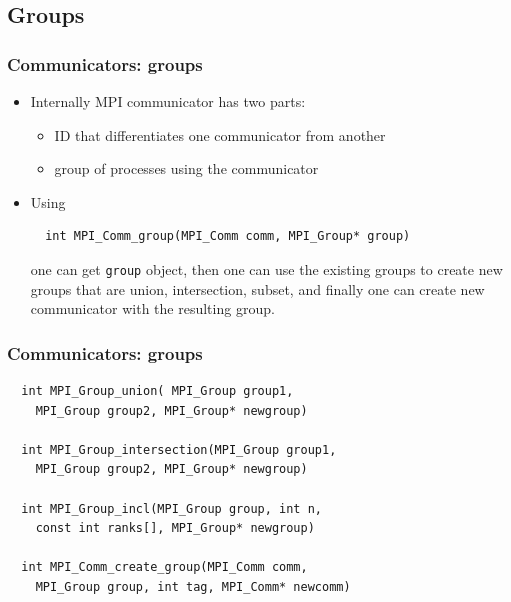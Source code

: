 \documentclass{beamer}
\begin{document}
\subsection{Groups}
\begin{frame}[fragile]
  \frametitle{Communicators: groups}
\begin{itemize}
\item Internally MPI communicator has two parts:
\begin{itemize}
\item ID that differentiates one communicator from another
\item group of processes using the communicator
\end{itemize}
\item Using
{\color{mycolorcode}
\begin{verbatim}
  int MPI_Comm_group(MPI_Comm comm, MPI_Group* group)
\end{verbatim}
}
one can get {\color{mycolorcode}\verb|group|} object, then one can use the existing groups to create new groups that are union, intersection, subset, and finally one can create new communicator with the resulting group.
\end{itemize}
\end{frame}

\begin{frame}[fragile]
  \frametitle{Communicators: groups}
{\color{mycolorcode}
\begin{verbatim}
  int MPI_Group_union( MPI_Group group1, 
    MPI_Group group2, MPI_Group* newgroup)

  int MPI_Group_intersection(MPI_Group group1, 
    MPI_Group group2, MPI_Group* newgroup)

  int MPI_Group_incl(MPI_Group group, int n, 
    const int ranks[], MPI_Group* newgroup)

  int MPI_Comm_create_group(MPI_Comm comm, 
    MPI_Group group, int tag, MPI_Comm* newcomm)
\end{verbatim}
}
\end{frame}
\end{document}
